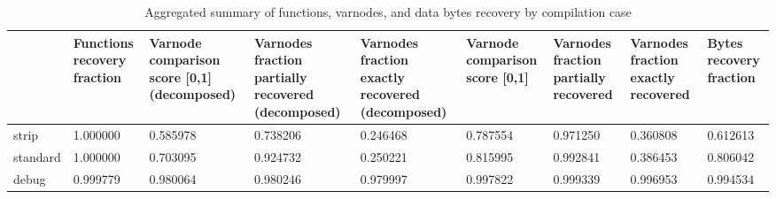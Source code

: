 \begin{table}[t]
\centering
\caption{Aggregated summary of functions, varnodes, and data bytes recovery by compilation case}
\label{table:opts-overall-summary}
\begin{tabular}{lp{2.2cm}p{2.2cm}p{2.2cm}p{2.2cm}p{2.2cm}p{2.2cm}p{2.2cm}p{2.2cm}}
\toprule
{} &  Functions recovery fraction &  Varnode comparison score [0,1] (decomposed) &  Varnodes fraction partially recovered (decomposed) &  Varnodes fraction exactly recovered (decomposed) &  Varnode comparison score [0,1] &  Varnodes fraction partially recovered &  Varnodes fraction exactly recovered &  Bytes recovery fraction \\
\midrule
strip    &                     1.000000 &                                     0.585978 &                                           0.738206 &                                          0.246468 &                        0.787554 &                               0.971250 &                             0.360808 &                 0.612613 \\
standard &                     1.000000 &                                     0.703095 &                                           0.924732 &                                          0.250221 &                        0.815995 &                               0.992841 &                             0.386453 &                 0.806042 \\
debug    &                     0.999779 &                                     0.980064 &                                           0.980246 &                                          0.979997 &                        0.997822 &                               0.999339 &                             0.996953 &                 0.994534 \\
\bottomrule
\end{tabular}
\end{table}
